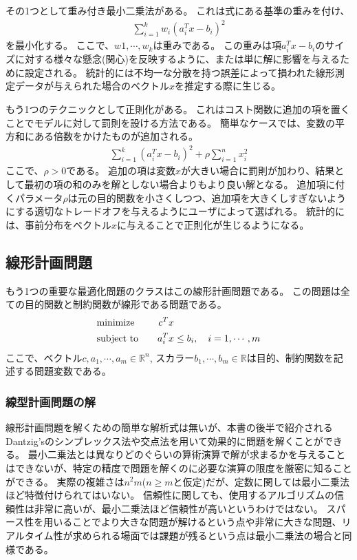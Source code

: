 \documentclass[a4paper, 10pt, uplatex]{jsreport}
\begin{document}
その1つとして重み付き最小二乗法がある。
これは式にある基準の重みを付け、
\begin{align}
    \sum^k_{i=1}w_i(a^T_ix-b_i)^2
\end{align}
を最小化する。
ここで、$w1,\cdots,w_k$は重みである。
この重みは項$a^T_ix-b_i$のサイズに対する様々な懸念(関心)を反映するように、または単に解に影響を与えるために設定される。
統計的には不均一な分散を持つ誤差によって損われた線形測定データが与えられた場合のベクトル$x$を推定する際に生じる。

もう1つのテクニックとして正則化がある。
これはコスト関数に追加の項を置くことでモデルに対して罰則を設ける方法である。
簡単なケースでは、変数の平方和にある倍数をかけたものが追加される。
\begin{align}
    \sum^k_{i=1}(a_i^Tx-b_i)^2+\rho \sum^n_{i=1}x^2_i
\end{align}
ここで、$\rho > 0$である。
追加の項は変数$x$が大きい場合に罰則が加わり、結果として最初の項の和のみを解としない場合よりもより良い解となる。
追加項に付くパラメータ$\rho$は元の目的関数を小さくしつつ、追加項を大きくしすぎないようにする適切なトレードオフを与えるようにユーザによって選ばれる。
統計的には、事前分布をベクトル$x$に与えることで正則化が生じるようになる。

\subsection{線形計画問題}
もう1つの重要な最適化問題のクラスはこの線形計画問題である。
この問題は全ての目的関数と制約関数が線形である問題である。
\begin{alignat}{2}
    &\text{minimize}   & \quad c^Tx   & \notag \\
    &\text{subject to} & \quad a_i^Tx & \leq b_i, \quad i = 1,\cdots,m \label{eq:lp-form}
\end{alignat}
ここで、ベクトル$c,a_1,\cdots,a_m \in \mathbb{R}^n$, スカラー$b_1,\cdots,b_m \in \mathbb{R}$は目的、制約関数を記述する問題変数である。

\subsubsection{線型計画問題の解}
線形計画問題を解くための簡単な解析式は無いが、本書の後半で紹介されるDantzig'sのシンプレックス法や交点法を用いて効果的に問題を解くことができる。
最小二乗法とは異なりどのぐらいの算術演算で解が求まるかを与えることはできないが、特定の精度で問題を解くのに必要な演算の限度を厳密に知ることができる。
実際の複雑さは$n^2m$($n \geq m$と仮定)だが、定数に関しては最小二乗法ほど特徴付けられてはいない。
信頼性に関しても、使用するアルゴリズムの信頼性は非常に高いが、最小二乗法ほど信頼性が高いというわけではない。
スパース性を用いることでより大きな問題が解けるという点や非常に大きな問題、リアルタイム性が求められる場面では課題が残るという点は最小二乗法の場合と同様である。
\end{document}
